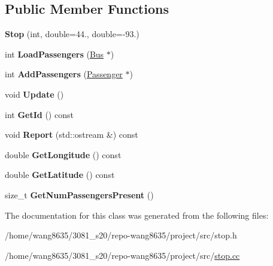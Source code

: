 \subsection*{Public Member Functions}
\begin{DoxyCompactItemize}
\item 
\mbox{\label{classStop_a59d881f072b1cf89512bb15a51ffc773}} 
{\bfseries Stop} (int, double=44., double=-\/93.)
\item 
\mbox{\label{classStop_a02c6dcba2b6de5fdd008cf623f19bf7c}} 
int {\bfseries Load\+Passengers} (\hyperlink{classBus}{Bus} $\ast$)
\item 
\mbox{\label{classStop_a20a8b6035679d92a7a838a03a102bcd1}} 
int {\bfseries Add\+Passengers} (\hyperlink{classPassenger}{Passenger} $\ast$)
\item 
\mbox{\label{classStop_aa373ae256ce6bc01ef13e876dfdec5bd}} 
void {\bfseries Update} ()
\item 
\mbox{\label{classStop_a2f3b845d5a338f197226c90696314904}} 
int {\bfseries Get\+Id} () const
\item 
\mbox{\label{classStop_a8e286b7cca2dce6977ebda6f01805d94}} 
void {\bfseries Report} (std\+::ostream \&) const
\item 
\mbox{\label{classStop_a89e650eecf57c03ba0a5222bf5f666f5}} 
double {\bfseries Get\+Longitude} () const
\item 
\mbox{\label{classStop_a20ad94a1876baf31d8cf0708aae4d21f}} 
double {\bfseries Get\+Latitude} () const
\item 
\mbox{\label{classStop_a38b567326cfc072113b305a77a9e1315}} 
size\+\_\+t {\bfseries Get\+Num\+Passengers\+Present} ()
\end{DoxyCompactItemize}


The documentation for this class was generated from the following files\+:\begin{DoxyCompactItemize}
\item 
/home/wang8635/3081\+\_\+s20/repo-\/wang8635/project/src/stop.\+h\item 
/home/wang8635/3081\+\_\+s20/repo-\/wang8635/project/src/\hyperlink{stop_8cc}{stop.\+cc}\end{DoxyCompactItemize}
